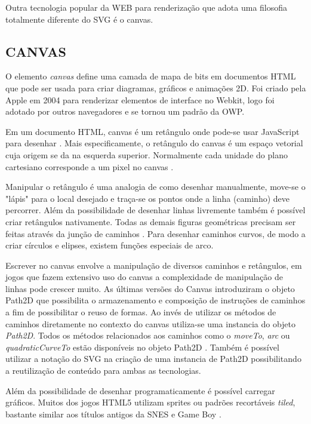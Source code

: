 Outra tecnologia popular da WEB para renderização que adota uma filosofia totalmente 
diferente do SVG é o canvas.
\subsection{CANVAS}
O elemento \textit{canvas} define uma camada de mapa de bits em
documentos HTML que pode ser usada para criar diagramas, gráficos e
animações 2D. Foi criado pela Apple em 2004 para renderizar elementos
de interface no Webkit, logo foi adotado por outros navegadores e se
tornou um padrão da OWP.

Em um documento HTML, canvas é um retângulo onde pode-se usar
JavaScript para desenhar \autocite[pp. 113]{diveIntohtml}. Mais
especificamente, o retângulo do canvas é um espaço vetorial cuja
origem se da na esquerda superior. Normalmente cada unidade do plano
cartesiano corresponde a um pixel no canvas \autocite{mdnCanvas}.

Manipular o retângulo é uma analogia de como desenhar manualmente,
move-se o "lápis" para o local desejado e traça-se os pontos onde
a linha (caminho) deve percorrer. Além da possibilidade de desenhar
linhas livremente também é possível criar retângulos nativamente.
Todas as demais figuras geométricas precisam ser feitas através da
junção de caminhos \autocite{mdnCanvas}. Para desenhar caminhos
curvos, de modo a criar círculos e elipses, existem funções especiais
de arco.

Escrever no canvas envolve a manipulação de diversos caminhos e
retângulos, em jogos que fazem extensivo uso do canvas a complexidade
de manipulação de linhas pode crescer muito. As últimas versões do
Canvas introduziram o objeto Path2D que possibilita o armazenamento e
composição de instruções de caminhos a fim de possibilitar o reuso
de formas. Ao invés de utilizar os métodos de caminhos diretamente no
contexto do canvas utiliza-se uma instancia do objeto \textit{Path2D}.
Todos os métodos relacionados aos caminhos como o \textit{moveTo},
\textit{arc} ou \textit{quadraticCurveTo} estão disponíveis no
objeto Path2D \autocite{mdnCanvas}. Também é possível utilizar a
notação do SVG na criação de uma instancia de Path2D possibilitando
a reutilização de conteúdo para ambas as tecnologias.

Além da possibilidade de desenhar programaticamente é possível
carregar gráficos. Muitos dos jogos HTML5 utilizam sprites ou padrões
recortáveis \textit{tiled}, bastante similar aos títulos antigos da
SNES e Game Boy \autocite{buildingHtml5Game}.

